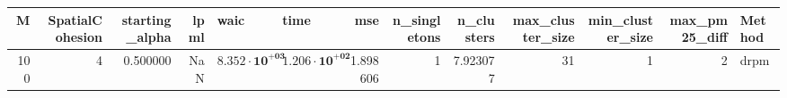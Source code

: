 \begin{tabular}{rrrrllrrrrrrl}
\toprule
M & SpatialCohesion & starting_alpha & lpml & waic & time & mse & n_singletons & n_clusters & max_cluster_size & min_cluster_size & max_pm25_diff & Method \\
\midrule
100 & 4 & 0.500000 & NaN & $\mathbf{8.352 \cdot 10^{+03}}$ & $\mathbf{1.206 \cdot 10^{+02}}$ & 1.898606 & 1 & 7.923077 & 31 & 1 & 2 & drpm \\
\bottomrule
\end{tabular}
